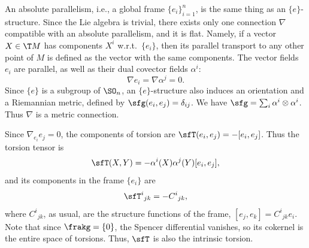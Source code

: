 \begin{example}\label{ex absolute parallelism}
    An absolute parallelism, i.e., a global frame $\{e_i\}_{i=1}^n$, is the same thing as an $\{e\}$-structure. Since the Lie algebra is trivial, there exists only one connection $\nabla$ compatible with an absolute parallelism, and it is flat. Namely, if a vector $X\in \T M$ has components $X^i$ w.r.t.\ $\{e_i\}$, then its parallel transport to any other point of $M$ is defined as the vector with the same components. The vector fields $e_i$ are parallel, as well as their dual covector fields $\alpha^i$:
    \[\nabla e_i=\nabla \alpha^j=0.\]
    Since $\{e\}$ is a subgroup of $\SO_n$, an $\{e\}$-structure also induces an orientation and a Riemannian metric, defined by $\sfg(e_i,e_j)=\delta_{ij}$. We have $\sfg=\sum_i \alpha^i\otimes\alpha^i$. Thus $\nabla$ is a metric connection.

    Since $\nabla_{e_i}e_j=0$, the components of torsion are $\sfT(e_i,e_j)=-[e_i,e_j]$. Thus the torsion tensor is
    \[\sfT(X,Y)=-\alpha^i(X)\alpha^j(Y)[e_i,e_j],\]
    and its components in the frame $\{e_i\}$ are 
    \[\sfT^i{}_{jk}=-C^i{}_{jk},\]
    where $C^i{}_{jk}$, as usual, are the structure functions of the frame, $[e_j,e_k]=C^i{}_{jk}e_i$. Note that since $\frakg=\{0\}$, the Spencer differential vanishes, so its cokernel is the entire space of torsions. Thus, $\sfT$ is also the intrinsic torsion.


\end{example}
